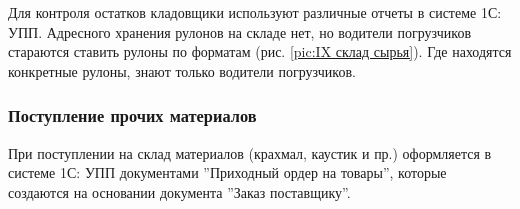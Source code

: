 Для контроля остатков кладовщики используют различные отчеты в системе 1С: УПП. 
Адресного хранения рулонов на складе нет, но водители погрузчиков стараются ставить рулоны по форматам (рис. \ref{pic:IX склад сырья}). Где находятся конкретные рулоны, знают только водители погрузчиков.





\subsubsection{Поступление прочих материалов}

При поступлении на склад материалов (крахмал, каустик и пр.) оформляется в системе 1С: УПП  документами ''Приходный ордер на товары'', которые создаются на основании документа ''Заказ поставщику''. 








